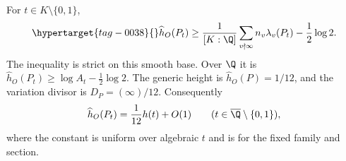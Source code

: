 \begin{proposition}\hypertarget{tag-000Y}{}\label{ari:C.6.4}

For $t\in K\setminus\{0,1\}$,
\begin{equation}\hypertarget{tag-0038}{}\label{ari:eq:ch-bound}
 \widehat h_O(P_t)\geq
 \frac1{[K:\Q]}\sum_{v\nmid\infty}n_v\lambda_v(P_t)
                    -\frac12\log2.
\end{equation}
The inequality is strict on this smooth base. Over $\Q$ it
is $\widehat h_O(P_t)\geq\log A_t-\frac12\log2$.
The generic height is $\widehat h_O(P)=1/12$, and the
variation divisor is $D_P=(\infty)/12$. Consequently
\[
 \widehat h_O(P_t)=\frac1{12}h(t)+O(1)
 \qquad(t\in\overline\Q\setminus\{0,1\}),
\]
where the constant is uniform over algebraic $t$ and is for
the fixed family and section.
\end{proposition}



